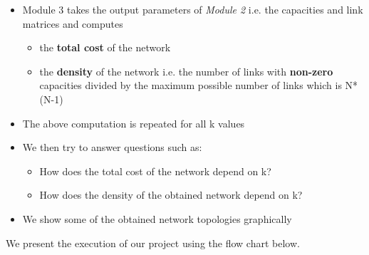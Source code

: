 \documentclass[12pt,letterpaper,titlepage,en-US]{article}
\begin{document}
\begin{itemize}
\begin{itemize}
\item Module 3 takes the output parameters of \textit{Module 2} i.e. the capacities and link matrices and computes
 \begin{itemize}
 \item the \textbf{total cost} of the network
 \item the \textbf{density} of the network i.e. the number of links with \textbf{non-zero} capacities divided by the maximum possible number of links which is N*(N-1)
 \end{itemize}
 
 \item The above computation is repeated for all k values
 
\item We then try to answer questions such as:
\begin{itemize}
\item How does the total cost of the network depend on k?
\item How does the density of the obtained network depend on k? 
\end{itemize}

\item We show some of the obtained network topologies graphically 
\end{itemize}

We present the execution of our project using the flow chart below.\\


\end{itemize}
\end{document}
